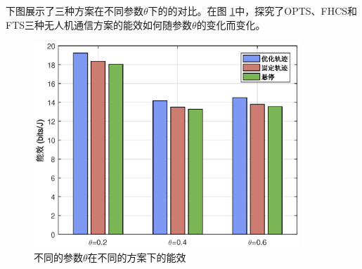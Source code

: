 下图展示了三种方案在不同参数$\theta$下的的对比。在图 \ref{不同的参数在不同的方案下的能效}中，探究了OPTS、FHCS和FTS三种无人机通信方案的能效如何随参数$\theta$的变化而变化。
\begin{figure}[H]
\centering
\includegraphics[width=10cm]{figures//chap4//不同的参数在不同的方案下的能效.eps}
\caption{不同的参数$\theta$在不同的方案下的能效}
\label{不同的参数在不同的方案下的能效}
\end{figure}


